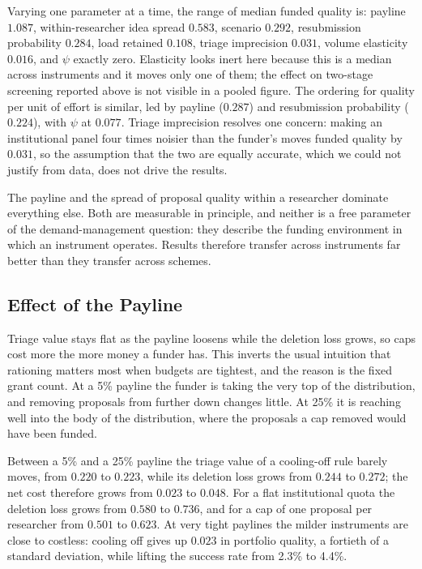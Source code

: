 \documentclass[11pt,a4paper]{article}
\begin{document}
Varying one parameter at a time, the range of median funded quality is: payline
$1.087$, within-researcher idea spread $0.583$, scenario $0.292$, resubmission
probability $0.284$, load retained $0.108$, triage imprecision $0.031$, volume
elasticity $0.016$, and $\psi$ exactly zero. Elasticity looks inert here because
this is a median across instruments and it moves only one of them; the effect on
two-stage screening reported above is not visible in a pooled figure. The ordering for quality per unit of
effort is similar, led by payline ($0.287$) and resubmission probability
($0.224$), with $\psi$ at $0.077$. Triage imprecision resolves one concern:
making an institutional panel four times noisier than the funder's moves funded
quality by $0.031$, so the assumption that the two are equally accurate, which we
could not justify from data, does not drive the results.

The payline and the spread of proposal quality within a researcher dominate
everything else. Both are measurable in principle, and neither is a free parameter
of the demand-management question: they describe the funding environment in
which an instrument operates. Results therefore transfer across instruments far
better than they transfer across schemes.

\subsection{Effect of the Payline}
\label{sec:payline}

Triage value stays flat as the payline loosens while the deletion loss grows, so
caps cost more the more money a funder has. This inverts the usual intuition that
rationing matters most when budgets are tightest, and the reason is the fixed
grant count. At a 5\% payline the funder is taking the very top of the distribution, and
removing proposals from further down changes little. At 25\% it is reaching well
into the body of the distribution, where the proposals a cap removed would have
been funded.

Between a 5\% and a 25\% payline the triage value of a cooling-off rule barely
moves, from $0.220$ to $0.223$, while its deletion loss grows from $0.244$ to
$0.272$; the net cost therefore grows from $0.023$ to $0.048$. For a flat
institutional quota the deletion loss grows from $0.580$ to $0.736$, and for a cap
of one proposal per researcher from $0.501$ to $0.623$. At very tight paylines the
milder instruments are close to costless: cooling off gives up $0.023$ in
portfolio quality, a fortieth of a standard deviation, while lifting the success
rate from 2.3\% to 4.4\%.
\end{document}
